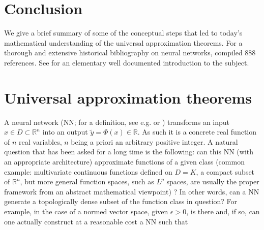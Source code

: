 \documentclass{article}
\begin{document}


%

\section{Conclusion}
\label{sec:conclusion}








\newpage
\appendix


We give a brief summary of some of the conceptual steps that led to today's mathematical understanding of the universal approximation theorems. For a thorough and extensive historical bibliography on neural networks, \cite{schmidhuber2015deep} compiled 888 references. See \cite{goodfellow2016deep} for an elementary well documented introduction to the subject.

\section{Universal approximation theorems}

A neural network (NN; for a definition, see e.g. \cite{pinkus1999approximation} or \cite{calin2020deep}) transforms an input $x\in D\subset\mathbb{R}^{n}$ into an output $\widetilde{y}=\Phi\left(  x\right)  \in\mathbb{R}$. As such it is a concrete real function of $n$ real variables, $n$ being a priori an arbitrary positive integer. A natural question that has been asked for a long time is the following: can this NN (with an appropriate architecture) approximate functions of a given class (common example: multivariate continuous functions defined on $D=K$, a compact subset of $\mathbb{R}^{n}$, but more general function spaces, such as $L^{p}$ spaces, are usually the proper framework from an abstract mathematical viewpoint) \citep{mhaskar1996system}? In other words, can a NN generate a topologically dense subset of the function class in question? For example, in the case of a normed vector space, given $\epsilon>0$, is there and, if so, can one actually construct at a reasonable cost a NN such that
\end{document}
